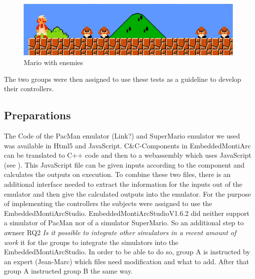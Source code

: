 \begin{figure}[!h]
	\centering
	\includegraphics[scale=0.55]{pictures/Mario4.PNG}
	\caption{Mario with enemies}
	\label{fig:marioFight}
\end{figure}

The two groups were then assigned to use these tests as a guideline to develop their controllers.

\subsection{Preparations}
The Code of the PacMan emulator (Link?) and SuperMario emulator \cite{marioLink} we used was available in Html5 and JavaScript. C\&C-Components in EmbeddedMontiArc can be translated to C++ code and then to a webassembly which uses JavaScript (see \cite{bertram2017component}). This JavaScript file can be given inputs according to the component and calculates the outputs on execution. To combine these two files, there is an additional interface needed to extract the information for the inputs out of the emulator and then give the calculated outputs into the emulator.
For the purpose of implementing the controllers the subjects were assigned to use the EmbeddedMontiArcStudio.
EmbeddedMontiArcStudioV1.6.2 did neither support a simulator of PacMan nor of a simulator SuperMario. So an additional step to awnser RQ2 \textit{Is it possible to integrate other simulators in a recent amount of work} it for the groups to integrate the simulators into the EmbeddedMontiArcStudio.
In order to be able to do so, group A is instructed by an expert (Jean-Marc) which files need modification and what to add. After that group A instructed group B the same way.

